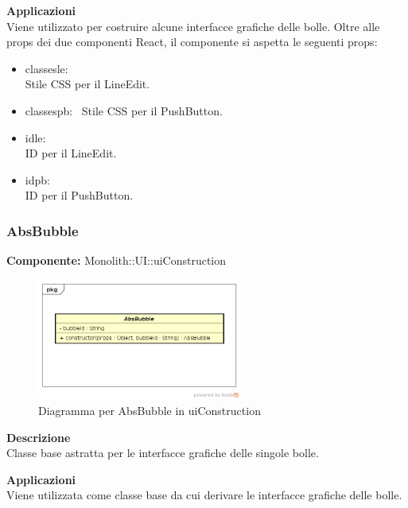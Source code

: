 \textbf{Applicazioni}\\
Viene utilizzato per costruire alcune interfacce grafiche delle bolle.
Oltre alle props dei due componenti React, il componente si aspetta le seguenti props:
\begin{itemize}

\item classesle:
\\
Stile CSS per il LineEdit.
\item classespb:
\ 
Stile CSS per il PushButton.

\item idle:
\\
ID per il LineEdit.
\item idpb: 
\\
ID per il PushButton.
\end{itemize} 


\clearpage

\subsubsection{AbsBubble}
\textbf{Componente:}  Monolith::UI::uiConstruction\\
   \FloatBarrier
   \begin{figure}[ht]
   \centering
   \includegraphics[width=0.6\textwidth]{img/single-AbsBubble}
   \caption{{Diagramma per AbsBubble in uiConstruction}}
\end{figure}
\FloatBarrier
\textbf{Descrizione}\\
Classe base astratta per le interfacce grafiche delle singole bolle. 


\textbf{Applicazioni}\\
Viene utilizzata come classe base da cui derivare le interfacce grafiche delle bolle. 


\clearpage

